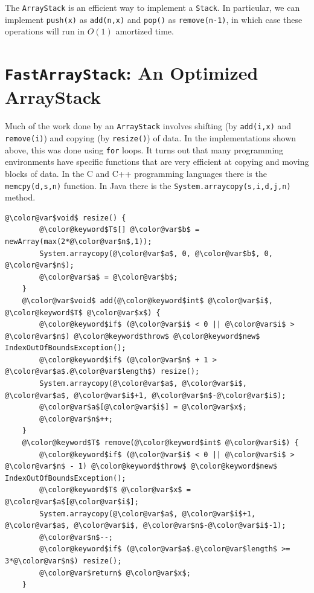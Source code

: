 The \mbox{\texttt{ArrayStack}} is an efficient way to implement a \mbox{\texttt{Stack}}.
In particular, we can implement \mbox{\texttt{push({\color{var}x})}} as \mbox{\texttt{add({\color{var}n},{\color{var}x})}} and \mbox{\texttt{pop()}}
as \mbox{\texttt{remove({\color{var}n}-1)}}, in which case these operations will run in $O(1)$
amortized time.

\section{\mbox{\texttt{FastArrayStack}}: An Optimized ArrayStack}
Much of the work done by an \mbox{\texttt{ArrayStack}} involves shifting (by
\mbox{\texttt{add({\color{var}i},{\color{var}x})}} and \mbox{\texttt{remove({\color{var}i})}}) and copying (by \mbox{\texttt{resize()}}) of data.  In the
implementations shown above, this was done using \mbox{\texttt{{\color{keyword}for}}} loops. It turns
out that many programming environments have specific functions that are
very efficient at copying and moving blocks of data.  In the C and C++
programming languages there is the \mbox{\texttt{memcpy({\color{var}d},{\color{var}s},{\color{var}n})}} function.  In Java
there is the \mbox{\texttt{System.arraycopy({\color{var}s},{\color{var}i},{\color{var}d},{\color{var}j},{\color{var}n})}} method.

\begin{Verbatim}[tabsize=2,frame=single,commandchars=\\@\$,label=\texttt{FastArrayStack},labelposition=topline]
	@\color@var$void$ resize() {
		@\color@keyword$T$[] @\color@var$b$ = newArray(max(2*@\color@var$n$,1));
		System.arraycopy(@\color@var$a$, 0, @\color@var$b$, 0, @\color@var$n$);
		@\color@var$a$ = @\color@var$b$;
	}
	@\color@var$void$ add(@\color@keyword$int$ @\color@var$i$, @\color@keyword$T$ @\color@var$x$) {
		@\color@keyword$if$ (@\color@var$i$ < 0 || @\color@var$i$ > @\color@var$n$) @\color@keyword$throw$ @\color@keyword$new$ IndexOutOfBoundsException();
		@\color@keyword$if$ (@\color@var$n$ + 1 > @\color@var$a$.@\color@var$length$) resize();
		System.arraycopy(@\color@var$a$, @\color@var$i$, @\color@var$a$, @\color@var$i$+1, @\color@var$n$-@\color@var$i$); 
		@\color@var$a$[@\color@var$i$] = @\color@var$x$;
		@\color@var$n$++;
	}
	@\color@keyword$T$ remove(@\color@keyword$int$ @\color@var$i$) {
		@\color@keyword$if$ (@\color@var$i$ < 0 || @\color@var$i$ > @\color@var$n$ - 1) @\color@keyword$throw$ @\color@keyword$new$ IndexOutOfBoundsException();
		@\color@keyword$T$ @\color@var$x$ = @\color@var$a$[@\color@var$i$];
		System.arraycopy(@\color@var$a$, @\color@var$i$+1, @\color@var$a$, @\color@var$i$, @\color@var$n$-@\color@var$i$-1);
		@\color@var$n$--; 
		@\color@keyword$if$ (@\color@var$a$.@\color@var$length$ >= 3*@\color@var$n$) resize();
		@\color@var$return$ @\color@var$x$;
	}
\end{Verbatim}

